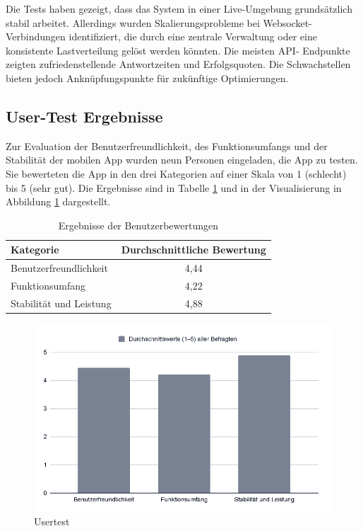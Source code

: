Die Tests haben gezeigt, dass das System in einer Live-Umgebung grundsätzlich stabil arbeitet. 
Allerdings wurden Skalierungsprobleme bei Websocket-Verbindungen identifiziert, die durch eine 
zentrale Verwaltung oder eine konsistente Lastverteilung gelöst werden könnten. Die meisten API-
Endpunkte zeigten zufriedenstellende Antwortzeiten und Erfolgsquoten. Die Schwachstellen bieten 
jedoch Anknüpfungspunkte für zukünftige Optimierungen.

\subsection{User-Test Ergebnisse}

Zur Evaluation der Benutzerfreundlichkeit, des Funktionsumfangs und der Stabilität der mobilen App 
wurden neun Personen eingeladen, die App zu testen. Sie bewerteten die App in den drei Kategorien 
auf einer Skala von 1 (schlecht) bis 5 (sehr gut). Die Ergebnisse sind in Tabelle 
\ref{tab:user_tests} und in der Visualisierung in Abbildung \ref{fig:user_tests2} dargestellt.

\begin{table}[h!]
    \centering
    \begin{tabular}{|l|c|}
        \hline
        \textbf{Kategorie} & \textbf{Durchschnittliche Bewertung} \\
        \hline
        Benutzerfreundlichkeit & 4,44 \\
        Funktionsumfang & 4,22 \\
        Stabilität und Leistung & 4,88 \\
        \hline
    \end{tabular}
    \caption{Ergebnisse der Benutzerbewertungen}
    \label{tab:user_tests}
\end{table}

\begin{figure}[h!]
    \centering
    \begin{minipage}{0.80\textwidth}
        \centering
        \includegraphics[width=\textwidth]{graphics/images/usertests_app.png}
        \caption{Usertest}
        \label{fig:user_tests2} %
    \end{minipage}
\end{figure}


